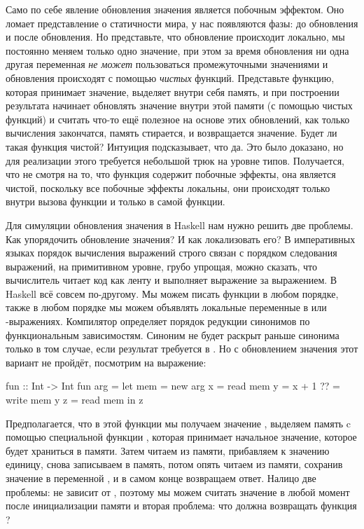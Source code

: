 Само по себе явление обновления значения является побочным
эффектом. Оно ломает представление о статичности мира,
у нас появляются фазы: до обновления и после обновления. 
Но представьте, что обновление происходит локально, 
мы постоянно меняем только одно значение, при этом за
время обновления ни одна другая переменная \emph{не может}
пользоваться промежуточными значениями и обновления происходят
с помощью \emph{чистых} функций. Представьте функцию, 
которая принимает значение, выделяет внутри себя память,
и при построении результата начинает обновлять значение 
внутри этой памяти (с помощью чистых функций) и считать 
что-то ещё полезное на основе этих обновлений, как только 
вычисления закончатся, память стирается, и возвращается
значение. Будет ли такая функция чистой? Интуиция
подсказывает, что да. Это было доказано, но для реализации 
этого требуется небольшой трюк на уровне типов. 
Получается, что не смотря на то, что функция содержит 
побочные эффекты, она является чистой, поскольку 
все побочные эффекты локальны, они происходят только 
внутри вызова функции и только в самой функции.

Для симуляции обновления значения в Haskell
нам нужно решить две проблемы. Как упорядочить обновление 
значения? И как локализовать его? В императивных
языках порядок вычисления выражений строго связан с порядком
следования выражений, на примитивном уровне, грубо упрощая,
можно сказать, что вычислитель читает код как ленту
и выполняет выражение за выражением. В Haskell всё совсем
по-другому. Мы можем писать функции в любом порядке, также
в любом порядке мы можем объявлять локальные переменные в
 или -выражениях. Компилятор определяет
порядок редукции синонимов по функциональным зависимостям. 
Синоним  не будет раскрыт раньше синонима 
только в том случае, если результат  требуется в .
Но с обновлением значения этот вариант не пройдёт, посмотрим
на выражение:

\begin{code}
fun :: Int -> Int
fun arg = 
    let mem = new arg
        x   = read mem
        y   = x + 1
        ??  = write mem y
        z   = read mem
    in z
\end{code}

Предполагается, что в этой функции мы получаем значение ,
выделяем память  c помощью специальной функции 
, которая принимает начальное значение,
которое будет храниться в памяти. 
Затем читаем из памяти, прибавляем к значению единицу, снова
записываем в память, потом опять читаем из памяти, сохранив
значение в переменной , и в самом конце возвращаем ответ. 
Налицо две проблемы:
 не зависит от , поэтому мы можем считать 
значение  в любой момент после инициализации памяти и
вторая проблема: что должна возвращать функция ?

